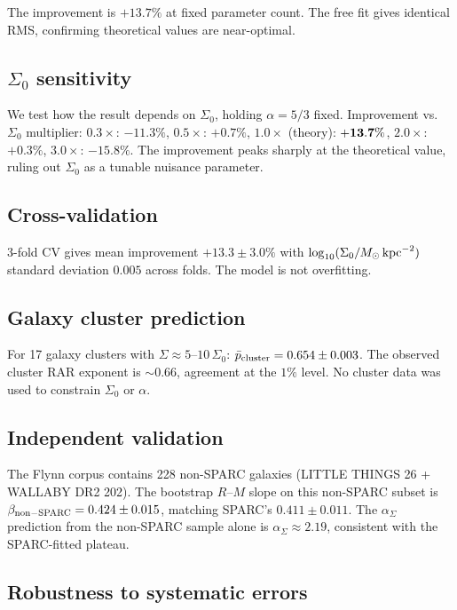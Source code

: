 \documentclass[twocolumn]{aastex631}
\begin{document}
The improvement is $+13.7\%$ at fixed parameter count. The free fit
gives identical RMS, confirming theoretical values are near-optimal.

\subsection{$\Sigma_0$ sensitivity}

We test how the result depends on $\Sigma_0$, holding $\alpha = 5/3$
fixed. Improvement vs.\ $\Sigma_0$ multiplier: $0.3\times$: $-11.3\%$,
$0.5\times$: $+0.7\%$, $1.0\times$ (theory): $\bf{+13.7\%}$,
$2.0\times$: $+0.3\%$, $3.0\times$: $-15.8\%$. The improvement peaks
sharply at the theoretical value, ruling out $\Sigma_0$ as a tunable
nuisance parameter.

\subsection{Cross-validation}

3-fold CV gives mean improvement $+13.3 \pm 3.0\%$ with
$\log_{10}(\Sigma_0/M_\odot\,{\rm kpc}^{-2})$ standard deviation
$0.005$ across folds. The model is not overfitting.

\subsection{Galaxy cluster prediction}

For 17 galaxy clusters with $\Sigma \approx 5$--$10\,\Sigma_0$:
$\bar{p}_{\rm cluster} = 0.654 \pm 0.003$. The observed cluster RAR
exponent is $\sim 0.66$, agreement at the $1\%$ level. No cluster
data was used to constrain $\Sigma_0$ or $\alpha$.

\subsection{Independent validation}

The Flynn corpus contains 228 non-SPARC galaxies (LITTLE THINGS 26
+ WALLABY DR2 202). The bootstrap $R$--$M$ slope on this non-SPARC
subset is $\beta_{\rm non-SPARC} = 0.424 \pm 0.015$, matching
SPARC's $0.411 \pm 0.011$. The $\alpha_\Sigma$ prediction from the
non-SPARC sample alone is $\alpha_\Sigma \approx 2.19$, consistent
with the SPARC-fitted plateau.

\subsection{Robustness to systematic errors}
\end{document}
